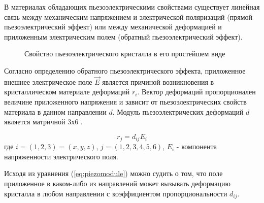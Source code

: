 \label{sec:piezo_theor}
В материалах обладающих пьезоэлектрическими свойствами существует
линейная связь между механическим напряжением и электрической поляризаций
(прямой пьезоэлектрический эффект) или между механической деформацией
и приложенным электрическим полем (обратный пьезоэлектрический эффект).

\begin{figure}[H]
  \centering
  \hfill
  \caption{Свойство пьезоэлектрического кристалла в его простейшем виде}
  \label{ris:piezo_is}
\end{figure}

Согласно определению обратного пьезоэлектрического эффекта,
приложенное внешнее электрическое поле $\vec{E}$ является причиной возникновения
в кристаллическом материале деформаций $r_i$. Вектор деформаций пропорционален
величине приложенного напряжения и зависит от пьезоэлектрических свойств материала
в данном направлении $d$. Модуль пьезоэлектрических деформаций $d$ является
матричной 3х6 \cite{kedi_1949,Newnham_2005}.


\begin{equation}
  r_j = d_{ij}E_i
  \label{eq:piezomodule}
\end{equation}
где $i = (1,2,3) = (x,y,z)$, $j = (1,2,3,4,5,6)$, $E_i$ - компонента напряженности электрического поля.

Исходя из уравнения (\ref{eq:piezomodule}) можно судить о том, что поле приложенное в каком-либо из
направлений может вызывать деформацию кристалла в любом направлении с коэффициентом пропорциональности $d_{ij}$.

